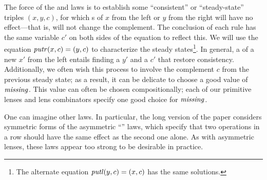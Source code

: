 \iftext The force of the  and  laws is to establish some
``consistent'' or ``steady-state'' triples $(x,y,c)$, for which \PUT{}s of $x$
from the left or $y$ from the right will have no effect---that is, will not
change the complement. The conclusion of each rule has the same variable
$c'$ on both sides of the equation to reflect this.  We will use the
equation $\mathit{putr}(x,c) = (y,c)$ to characterize the steady states\footnote{The
alternate equation $\mathit{putl}(y,c)=(x,c)$ has the same solutions.}.  In
general, a \PUT{} of a new $x'$ from the left entails finding a $y'$ and a
$c'$ that restore consistency.  Additionally, we often wish this
process to involve the
complement $c$ from the previous steady state; as a result, it can be
delicate to choose a good value of $\mathit{missing}$. This value can often be
chosen compositionally; each of our primitive lenses and lens combinators
specify one good choice for $\mathit{missing}$.

\iflater{}\fi \fi

\iffull\else One can imagine other laws.  In particular, the long version of
the paper considers symmetric forms of the asymmetric ``'' laws,
which specify that two \PUT{} operations in a row should have the same
effect as the second one alone.  As with asymmetric lenses, these
laws appear too strong to be desirable in practice.  \fi



